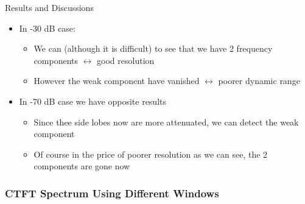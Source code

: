 \documentclass{beamer}
\begin{document}
\begin{frame}[t,allowframebreaks]{Results and Discussions}
\begin{itemize}
\item In -30 dB case:

	\begin{itemize}
	\item We can (although it is difficult) to see that we have 2 frequency components $\leftrightarrow$ good resolution
	
	\item However the weak component have vanished $\leftrightarrow$ poorer dynamic range
	\end{itemize}

\item In -70 dB case we have opposite results

	\begin{itemize}
	\item Since thee side lobes now are more attenuated, we can detect the weak component
	
	\item Of course in the price of poorer resolution as we can see, the 2 components are gone now
	\end{itemize}

\end{itemize}


\end{frame}


\subsubsection{CTFT Spectrum Using Different Windows}
\end{document}
